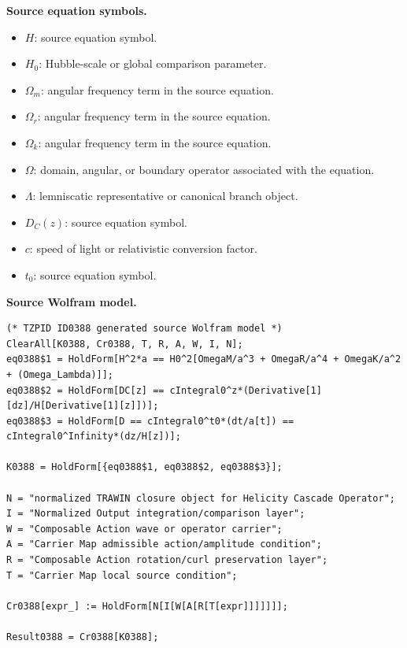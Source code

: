 \begin{minipage}[t]{0.49\linewidth}
\begingroup
\small
\raggedright
\textbf{Source equation symbols.}\par
\begin{itemize}[leftmargin=1.35em,itemsep=1pt,topsep=1pt,parsep=0pt]
    \item $H$: source equation symbol.
    \item $H_0$: Hubble-scale or global comparison parameter.
    \item $\Omega_m$: angular frequency term in the source equation.
    \item $\Omega_r$: angular frequency term in the source equation.
    \item $\Omega_k$: angular frequency term in the source equation.
    \item $\Omega$: domain, angular, or boundary operator associated with the equation.
    \item $\Lambda$: lemniscatic representative or canonical branch object.
    \item $D_C(z)$: source equation symbol.
    \item $c$: speed of light or relativistic conversion factor.
    \item $t_0$: source equation symbol.
\end{itemize}
\endgroup
\end{minipage}\hfill
\begin{minipage}[t]{0.47\linewidth}
\begingroup
\scriptsize
\raggedright
\textbf{Source Wolfram model.}\par
\begin{Verbatim}[fontsize=\tiny,breaklines=true,breakanywhere=true]
(* TZPID ID0388 generated source Wolfram model *)
ClearAll[K0388, Cr0388, T, R, A, W, I, N];
eq0388$1 = HoldForm[H^2*a == H0^2[OmegaM/a^3 + OmegaR/a^4 + OmegaK/a^2 + (Omega_Lambda)]];
eq0388$2 = HoldForm[DC[z] == cIntegral0^z*(Derivative[1][dz]/H[Derivative[1][z]])];
eq0388$3 = HoldForm[D == cIntegral0^t0*(dt/a[t]) == cIntegral0^Infinity*(dz/H[z])];

K0388 = HoldForm[{eq0388$1, eq0388$2, eq0388$3}];

N = "normalized TRAWIN closure object for Helicity Cascade Operator";
I = "Normalized Output integration/comparison layer";
W = "Composable Action wave or operator carrier";
A = "Carrier Map admissible action/amplitude condition";
R = "Composable Action rotation/curl preservation layer";
T = "Carrier Map local source condition";

Cr0388[expr_] := HoldForm[N[I[W[A[R[T[expr]]]]]]];

Result0388 = Cr0388[K0388];
\end{Verbatim}
\endgroup
\end{minipage}

